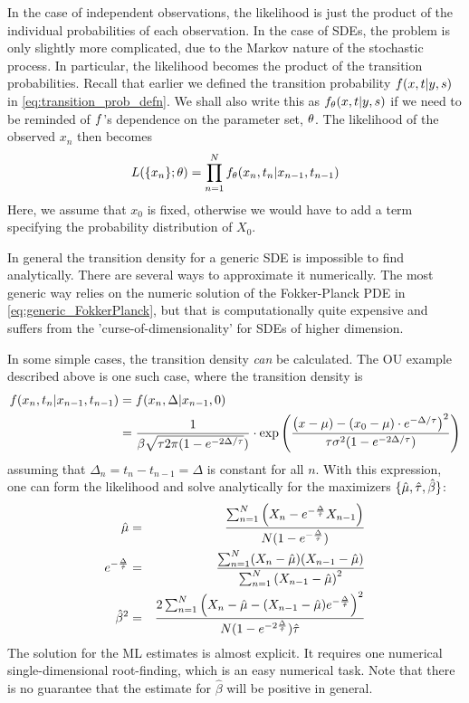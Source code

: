 In the case of independent observations, the
likelihood is just the product of the individual probabilities of each observation. In the case of SDEs, the problem is only slightly more complicated, due to the Markov nature of the stochastic process. In particular,
the likelihood becomes the product of the transition probabilities. Recall that
earlier we defined the transition probability ${f}(x,t | y,s)$ in
\cref{eq:transition_prob_defn}. We shall also write this as ${f}_{ \theta}(x,t|
y,s)$ if we need to be reminded of ${f}$'s dependence on the
parameter set, ${ \theta}$. The likelihood of the observed $x_n$ then
becomes
\begin{equation}
L(\{x_n\}; { \theta}) = \prod_{n=1}^{N} f_{ \theta}(x_n, t_n| x_{n-1}, t_{n-1})
\label{eq:SDE_discrete_likelihood}
\end{equation}
Here, we assume that $x_0$ is fixed, otherwise we would have to add a term
specifying the probability distribution of $X_0$.

In general the transition density for a generic SDE is impossible to find
analytically. There are several ways to approximate it numerically. The most
generic way relies on the numeric solution of the Fokker-Planck PDE in
\cref{eq:generic_FokkerPlanck}, but that is computationally quite expensive and suffers from the
'curse-of-dimensionality' for SDEs of higher dimension. 

In some simple cases, the transition density {\sl can} be calculated. The OU
example described above is one such case, where the transition density is
\begin{align*}
f(x_n, t_n| x_{n-1}, t_{n-1}) &=
 f(x_n, \Delta| x_{n-1}, 0)\\& =
 \frac{1}{ \beta \sqrt{{ \tau } 2\pi(1 -  e^{-2 \Delta/{ \tau }}})}
 	\cdot \exp\left(\frac{\left( x - \mu)  - (x_{0} - \mu) \cdot
 	 e^{-\Delta/{ \tau }} \right)^2  } {{\tau} \sigma^2  (1-e^{-2 \Delta/{ \tau }})}
 	\right) 
\end{align*}
assuming that $\Delta_n = t_n-t_{n-1} = \Delta$ is constant for all $n$.
With this expression, one can form the likelihood and solve analytically for the
maximizers $\{\hat{{\mu }} , \hat{{ \tau }}, \hat{\beta} \}$:
\begin{eqnarray} 
\hat{ \mu} &=& 
\frac{  \sum_{n=1}^{N } 
     \left( X_n - e^{-\frac{\Delta} {\hat {{ \tau }}}} X_{n-1} \right)} 
	 { N( 1-e^{-\frac {\Delta} {\hat {{ \tau }}}}) }
\\
e^{-\frac {\Delta}{\hat{{ \tau }}} } &=& 
\frac { \sum_{n=1}^{N} 
			( X_n -  \hat \mu)(X_{n-1} -  \hat \mu) }
    {   \sum_{n=1}^{N } \left( X_{n-1} - \hat \mu
    \right)^2 }
\\
\hat\beta^2 &=&  
\frac{ 2  \sum_{n=1}^{N}  \left( X_n - \hat \mu - (X_{n-1} -
\hat \mu) e^{-\frac {\Delta} {\hat {{ \tau }}}} \right)^2 } 
	  { N (1-e^{-2\frac {\Delta} {\hat {{ \tau }}}}) \hat {{ \tau }}}
\end{eqnarray}
The solution for the ML estimates is almost explicit. It requires one numerical
single-dimensional root-finding, which is an easy numerical task. Note that
there is no guarantee that the estimate for $\hat{\beta}$ will be positive in
general.

